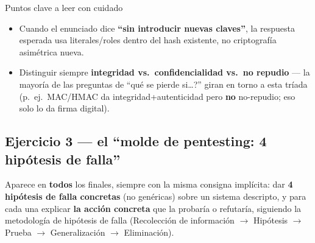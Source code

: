 \begin{defbox}{Puntos clave a leer con cuidado}
\begin{itemize}
  \item Cuando el enunciado dice \textbf{``sin introducir nuevas claves''}, la respuesta
  esperada usa literales/roles dentro del hash existente, no criptografía asimétrica nueva.
  \item Distinguir siempre \textbf{integridad vs.\ confidencialidad vs.\ no repudio} --- la
  mayoría de las preguntas de ``\textquestiondown{}qué se pierde si\ldots?'' giran en torno a esta tríada
  (p.\ ej.\ MAC/HMAC da integridad+autenticidad pero \textbf{no} no-repudio; eso solo lo da
  firma digital).
\end{itemize}
\end{defbox}

\subsection{Ejercicio 3 --- el ``molde de pentesting: 4 hipótesis de falla''}
Aparece en \textbf{todos} los finales, siempre con la misma consigna implícita: dar
\textbf{4 hipótesis de falla concretas} (no genéricas) sobre un sistema descripto, y para
cada una explicar \textbf{la acción concreta} que la probaría o refutaría, siguiendo la
metodología de hipótesis de falla (Recolección de información $\to$ Hipótesis $\to$ Prueba
$\to$ Generalización $\to$ Eliminación).

